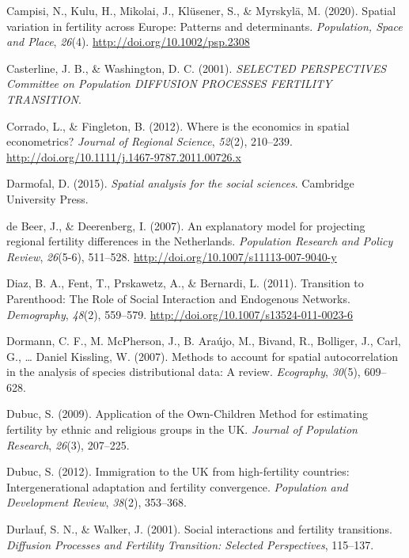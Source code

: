 \documentclass[12pt,twoside]{reedthesis}
\begin{document}
\leavevmode\hypertarget{ref-campisi2020}{}%
Campisi, N., Kulu, H., Mikolai, J., Klüsener, S., \& Myrskylä, M. (2020). Spatial variation in fertility across Europe: Patterns and determinants. \emph{Population, Space and Place}, \emph{26}(4). \url{http://doi.org/10.1002/psp.2308}

\leavevmode\hypertarget{ref-casterline2001}{}%
Casterline, J. B., \& Washington, D. C. (2001). \emph{SELECTED PERSPECTIVES Committee on Population DIFFUSION PROCESSES FERTILITY TRANSITION}.

\leavevmode\hypertarget{ref-corrado2012}{}%
Corrado, L., \& Fingleton, B. (2012). Where is the economics in spatial econometrics? \emph{Journal of Regional Science}, \emph{52}(2), 210--239. \url{http://doi.org/10.1111/j.1467-9787.2011.00726.x}

\leavevmode\hypertarget{ref-darmofal2015}{}%
Darmofal, D. (2015). \emph{Spatial analysis for the social sciences}. Cambridge University Press.

\leavevmode\hypertarget{ref-debeer2007}{}%
de Beer, J., \& Deerenberg, I. (2007). An explanatory model for projecting regional fertility differences in the Netherlands. \emph{Population Research and Policy Review}, \emph{26}(5-6), 511--528. \url{http://doi.org/10.1007/s11113-007-9040-y}

\leavevmode\hypertarget{ref-diaz2011}{}%
Diaz, B. A., Fent, T., Prskawetz, A., \& Bernardi, L. (2011). Transition to Parenthood: The Role of Social Interaction and Endogenous Networks. \emph{Demography}, \emph{48}(2), 559--579. \url{http://doi.org/10.1007/s13524-011-0023-6}

\leavevmode\hypertarget{ref-dormann2007}{}%
Dormann, C. F., M. McPherson, J., B. Araújo, M., Bivand, R., Bolliger, J., Carl, G., \ldots{} Daniel Kissling, W. (2007). Methods to account for spatial autocorrelation in the analysis of species distributional data: A review. \emph{Ecography}, \emph{30}(5), 609--628.

\leavevmode\hypertarget{ref-dubuc2009}{}%
Dubuc, S. (2009). Application of the Own-Children Method for estimating fertility by ethnic and religious groups in the UK. \emph{Journal of Population Research}, \emph{26}(3), 207--225.

\leavevmode\hypertarget{ref-dubuc2012}{}%
Dubuc, S. (2012). Immigration to the UK from high-fertility countries: Intergenerational adaptation and fertility convergence. \emph{Population and Development Review}, \emph{38}(2), 353--368.

\leavevmode\hypertarget{ref-durlauf2001}{}%
Durlauf, S. N., \& Walker, J. (2001). Social interactions and fertility transitions. \emph{Diffusion Processes and Fertility Transition: Selected Perspectives}, 115--137.
\end{document}
